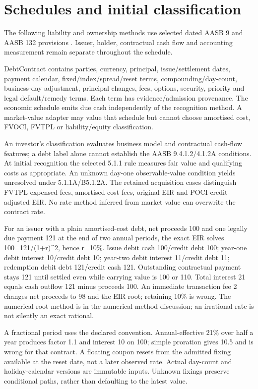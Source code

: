 \hypertarget{schedules-and-initial-classification}{%
\section{Schedules and initial classification}\label{method-financing-methods-schedules-and-initial-classification}}

The following liability and ownership methods use selected dated AASB 9 and AASB 132 provisions \citep{aasb9dated,aasb132}. Issuer, holder, contractual cash flow and accounting measurement remain separate throughout the schedule.

DebtContract contains parties, currency, principal, issue/settlement dates, payment calendar, fixed/index/spread/reset terms, compounding/day-count, business-day adjustment, principal changes, fees, options, security, priority and legal default/remedy terms. Each term has evidence/admission provenance. The economic schedule emits due cash independently of the recognition method. A market-value adapter may value that schedule but cannot choose amortised cost, FVOCI, FVTPL or liability/equity classification.

An investor's classification evaluates business model and contractual cash-flow features; a debt label alone cannot establish the AASB 9.4.1.2/4.1.2A conditions. At initial recognition the selected 5.1.1 rule measures fair value and qualifying costs as appropriate. An unknown day-one observable-value condition yields unresolved under 5.1.1A/B5.1.2A. The retained acquisition cases distinguish FVTPL expensed fees, amortised-cost fees, original EIR and POCI credit-adjusted EIR. No rate method inferred from market value can overwrite the contract rate.

For an issuer with a plain amortised-cost debt, net proceeds 100 and one legally due payment 121 at the end of two annual periods, the exact EIR solves 100=121/(1+r)\^{}2, hence r=10\%. Issue debit cash 100/credit debt 100; year-one debit interest 10/credit debt 10; year-two debit interest 11/credit debt 11; redemption debit debt 121/credit cash 121. Outstanding contractual payment stays 121 until settled even while carrying value is 100 or 110. Total interest 21 equals cash outflow 121 minus proceeds 100. An immediate transaction fee 2 changes net proceeds to 98 and the EIR root; retaining 10\% is wrong. The numerical root method is in the numerical-method discussion; an irrational rate is not silently an exact rational.

A fractional period uses the declared convention. Annual-effective 21\% over half a year produces factor 1.1 and interest 10 on 100; simple proration gives 10.5 and is wrong for that contract. A floating coupon resets from the admitted fixing available at the reset date, not a later observed rate. Actual day-count and holiday-calendar versions are immutable inputs. Unknown fixings preserve conditional paths, rather than defaulting to the latest value.

